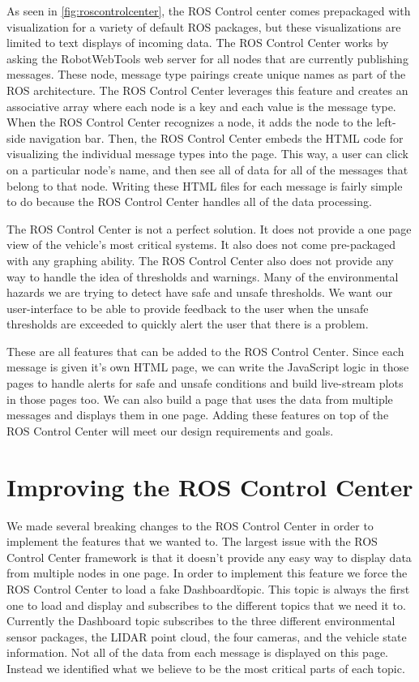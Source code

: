 As seen in \ref{fig:roscontrolcenter}, the ROS Control center comes prepackaged with visualization for a variety of default ROS packages, but these visualizations are limited to text displays of incoming data.  The ROS Control Center works by asking the RobotWebTools web server for all nodes that are currently publishing messages.  These node, message type pairings create unique names as part of the ROS architecture.  The ROS Control Center leverages this feature and creates an associative array where each node is a key and each value is the message type.  When the ROS Control Center recognizes a node, it adds the node to the left-side navigation bar.  Then, the ROS Control Center embeds the HTML code for visualizing the individual message types into the page.  This way, a user can click on a particular node's name, and then see all of data for all of the messages that belong to that node.  Writing these HTML files for each message is fairly simple to do because the ROS Control Center handles all of the data processing.

The ROS Control Center is not a perfect solution.  It does not provide a one page view of the vehicle's most critical systems.  It also does not come pre-packaged with any graphing ability.  The ROS Control Center also does not provide any way to handle the idea of thresholds and warnings. Many of the environmental hazards we are trying to detect have safe and unsafe thresholds.  We want our user-interface to be able to provide feedback to the user when the unsafe thresholds are exceeded to quickly alert the user that there is a problem.

These are all features that can be added to the ROS Control Center.  Since each message is given it's own HTML page, we can write the JavaScript logic in those pages to handle alerts for safe and unsafe conditions and build live-stream plots in those pages too.  We can also build a page that uses the data from multiple messages and displays them in one page.  Adding these features on top of the ROS Control Center will meet our design requirements and goals.

\section{Improving the ROS Control Center}
We made several breaking changes to the ROS Control Center in order to implement the features that we wanted to.  The largest issue with the ROS Control Center framework is that it doesn't provide any easy way to display data from multiple nodes in one page.  In order to implement this feature we force the ROS Control Center to load a fake \"Dashboard\" topic.  This topic is always the first one to load and display and subscribes to the different topics that we need it to.  Currently the Dashboard topic subscribes to the three different environmental sensor packages, the LIDAR point cloud, the four cameras, and the vehicle state information.  Not all of the data from each message is displayed on this page.  Instead we identified what we believe to be the most critical parts of each topic.  

